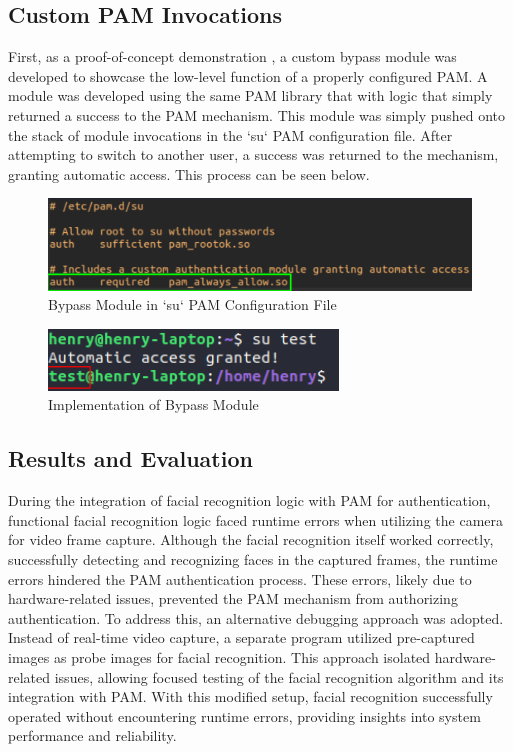 \documentclass[
]{article}
\begin{document}
\begin{multicols}{2}

\section{Custom PAM Invocations}
First, as a proof-of-concept demonstration , a custom bypass module was developed to showcase the low-level function of a properly configured PAM. A module was developed using the same PAM library that with logic that simply returned a success to the PAM mechanism. This module was simply pushed onto the stack of module invocations in the `su` PAM configuration file. After attempting to switch to another user, a success was returned to the mechanism, granting  automatic access. This process can be seen below.

\end{multicols}

\begin{figure}[htbp]
  \centering
  \includegraphics[width=0.4\linewidth]{images/bypass_config.png}
  \caption{Bypass Module in `su` PAM Configuration File}
\end{figure}

\begin{figure}[htbp]
  \centering
  \includegraphics[width=0.4\linewidth]{images/bypass_implementation.png}
  \caption{Implementation of Bypass Module}
\end{figure}

\begin{multicols}{2}

\section{Results and Evaluation}
During the integration of facial recognition logic with PAM for authentication, functional facial recognition logic faced runtime errors when utilizing the camera for video frame capture. Although the facial recognition itself worked correctly, successfully detecting and recognizing faces in the captured frames, the runtime errors hindered the PAM authentication process. These errors, likely due to hardware-related issues, prevented the PAM mechanism from authorizing authentication. To address this, an alternative debugging approach was adopted. Instead of real-time video capture, a separate program utilized pre-captured images as probe images for facial recognition. This approach isolated hardware-related issues, allowing focused testing of the facial recognition algorithm and its integration with PAM. With this modified setup, facial recognition successfully operated without encountering runtime errors, providing insights into system performance and reliability. 

\end{multicols}
\end{document}
